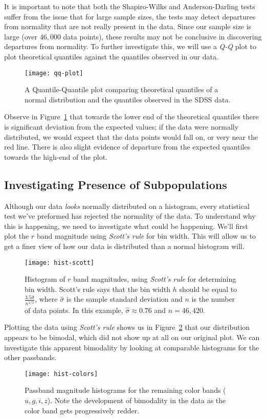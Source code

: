 It is important to note that both the Shapiro-Wilks and Anderson-Darling tests suffer from the issue that for large sample sizes, the tests may detect departures from normality that are not really present in the data. Since our sample size is large (over $46,000$ data points), these results may not be conclusive in discovering departures from normality. To further investigate this, we will use a \emph{Q-Q} plot to plot theoretical quantiles against the quantiles observed in our data.
\begin{figure}
	\texttt{[image: qq-plot]}
	\caption{A Quantile-Quantile plot comparing theoretical quantiles of a normal distribution and the quantiles observed in the SDSS data.}
	\label{fig:qq}
\end{figure}
Observe in Figure~\ref{fig:qq} that towards the lower end of the theoretical quantiles there is significant deviation from the expected values; if the data were normally distributed, we would expect that the data points would fall on, or very near the red line. There is also slight evidence of departure from the expected quantiles towards the high-end of the plot.

\subsection*{Investigating Presence of Subpopulations}
Although our data \emph{looks} normally distributed on a histogram, every statistical test we've preformed has rejected the normality of the data. To understand why this is happening, we need to investigate what could be happening. We'll first plot the $r$ band magnitude using \emph{Scott's rule} for bin width. This will allow us to get a finer view of how our data is distributed than a normal histogram will.
\begin{figure}
	\texttt{[image: hist-scott]}
	\caption{Histogram of $r$ band magnitudes, using \emph{Scott's rule} for determining bin width. Scott's rule says that the bin width $h$ should be equal to $\frac{3.5\hat{\sigma}}{n^{1/3}}$, where $\hat{\sigma}$ is the sample standard deviation and $n$ is the number of data points. In this example, $\hat{\sigma} \approx 0.76$ and $n = 46,420$.}
	\label{fig:hist-scott}
\end{figure}
Plotting the data using \emph{Scott's rule} shows us in Figure~\ref{fig:hist-scott} that our distribution appears to be bimodal, which did not show up at all on our original plot. We can investigate this apparent bimodality by looking at comparable histograms for the other passbands.
\begin{figure}
	\texttt{[image: hist-colors]}
	\caption{Passband magnitude histograms for the remaining color bands ($u,g,i,z$). Note the development of bimodality in the data as the color band gets progressively redder. }
	\label{fit:hist-colors}
\end{figure}

